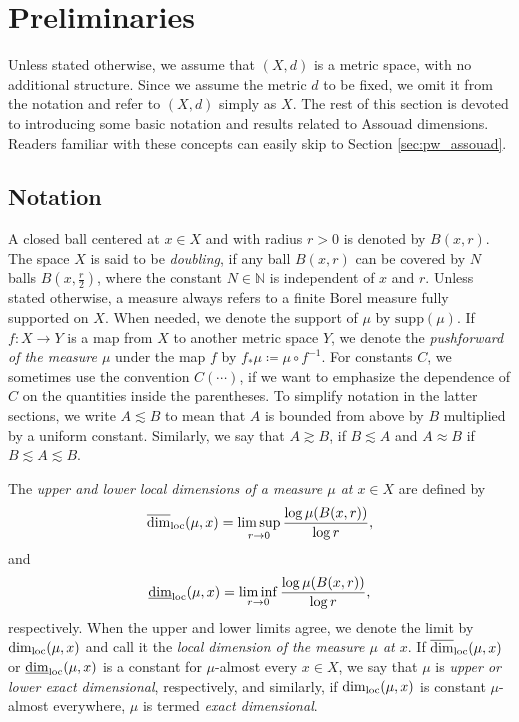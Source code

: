 \documentclass{PRM}
\newcommand{\field}[1]{\mathbb{#1}}
\newcommand{\N}{\field{N}}
\newcommand{\updim}{\overline{\dim}}
\newcommand{\lowdim}{\underline{\dim}}
\theoremstyle{plain}
\theoremstyle{definition}
\theoremstyle{remark}
\begin{document}
\section{Preliminaries}\label{sec:prelim}
Unless stated otherwise, we assume that $(X,d)$ is a metric space, with no additional structure. Since we assume the metric $d$ to be fixed, we omit it from the notation and refer to $(X,d)$ simply as $X$. The rest of this section is devoted to introducing some basic notation and results related to Assouad dimensions. Readers familiar with these concepts can easily skip to Section \ref{sec:pw_assouad}. 

\subsection{Notation}
A closed ball centered at $x\in X$ and with radius $r>0$ is denoted by $B(x,r)$. The space $X$ is said to be \emph{doubling}, if any ball $B(x,r)$ can be covered by $N$ balls $B(x,\frac{r}{2})$, where the constant $N\in \N$ is independent of $x$ and $r$. Unless stated otherwise, a measure always refers to a finite Borel measure fully supported on $X$. When needed, we denote the support of $\mu$ by $\mathrm{supp}(\mu)$. If $f:X\to Y$ is a map from $X$ to another metric space $Y$, we denote the \emph{pushforward of the measure $\mu$} under the map $f$ by $f_*\mu\coloneqq\mu\circ f^{-1}$.  For constants $C$, we sometimes use the convention $C(\cdots)$, if we want to emphasize the dependence of $C$ on the quantities inside the parentheses. To simplify notation in the latter sections, we write $A\lesssim B$ to mean that $A$ is bounded from above by $B$ multiplied by a uniform constant. Similarly, we say that $A\gtrsim B$, if $B\lesssim A$ and $A\approx B$ if $B\lesssim A\lesssim B$.


The \emph{upper and lower local dimensions of a measure $\mu$ at $x\in X$} are defined by
\begin{equation*}
    \updim_{\textnormal{loc}}(\mu,x)=\limsup_{r\to 0}\frac{\log \mu(B(x,r))}{\log r},
\end{equation*}
and
\begin{equation*}
    \lowdim_{\textnormal{loc}}(\mu,x)=\liminf_{r\to 0}\frac{\log \mu(B(x,r))}{\log r},
\end{equation*}
respectively. When the upper and lower limits agree, we denote the limit by $\dim_{\textnormal{loc}}(\mu,x)$ and call it the \emph{local dimension of the measure $\mu$ at $x$}. If $\updim_{\textnormal{loc}}(\mu,x)$ or $\lowdim_{\textnormal{loc}}(\mu,x)$ is a constant for $\mu$-almost every $x\in X$, we say that $\mu$ is \emph{upper or lower exact dimensional}, respectively, and similarly, if $\dim_{\textnormal{loc}}(\mu,x)$ is constant $\mu$-almost everywhere, $\mu$ is termed \emph{exact dimensional}.
\end{document}
